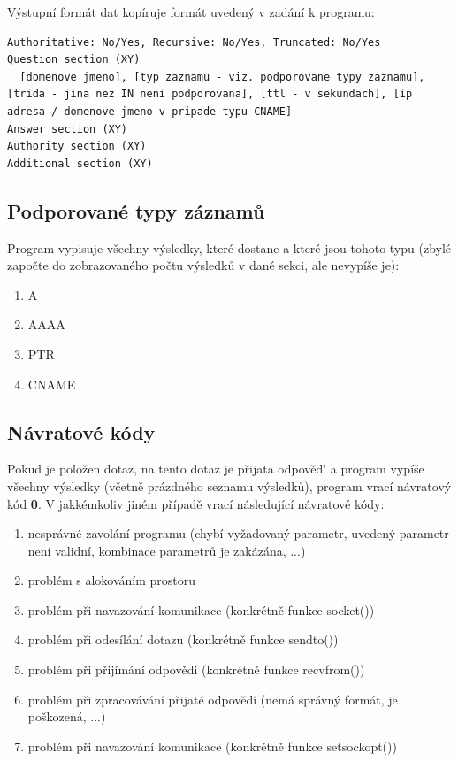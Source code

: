 \documentclass[a4paper,11pt]{article}
\begin{document}
Výstupní formát dat kopíruje formát uvedený v zadání k programu:

\begin{lstlisting}[frame=single, breaklines]
Authoritative: No/Yes, Recursive: No/Yes, Truncated: No/Yes
Question section (XY)
  [domenove jmeno], [typ zaznamu - viz. podporovane typy zaznamu], [trida - jina nez IN neni podporovana], [ttl - v sekundach], [ip adresa / domenove jmeno v pripade typu CNAME]
Answer section (XY)
Authority section (XY)
Additional section (XY)
\end{lstlisting}

\subsection{Podporované typy záznamů}

Program vypisuje všechny výsledky, které dostane a které jsou tohoto typu (zbylé započte do zobrazovaného počtu výsledků v dané sekci, ale nevypíše je):

\begin{enumerate}
\item A
\item AAAA
\item PTR
\item CNAME
\end{enumerate}

\subsection{Návratové kódy}

Pokud je položen dotaz, na tento dotaz je přijata odpověd’ a program vypíše všechny výsledky (včetně prázdného seznamu výsledků), program vrací návratový kód \textbf{0}. V jakkémkoliv jiném případě vrací následující návratové kódy:

\begin{enumerate}
\item nesprávné zavolání programu (chybí vyžadovaný parametr, uvedený parametr není validní, kombinace parametrů je zakázána, ...)
\item problém s alokováním prostoru
\item problém při navazování komunikace (konkrétně funkce socket())
\item problém při odesílání dotazu (konkrétně funkce sendto()) 
\item problém při přijímání odpovědi (konkrétně funkce recvfrom()) 
\item problém při zpracovávání přijaté odpovědí (nemá správný formát, je poškozená, ...)
\item problém při navazování komunikace (konkrétně funkce setsockopt())
\end{enumerate}
\end{document}
